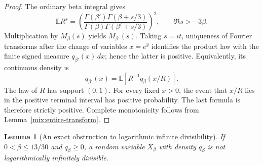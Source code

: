 \documentclass[11pt,a4paper]{article}
\numberwithin{equation}{section}
\newtheorem{lemma}[theorem]{Lemma}
\theoremstyle{definition}\newtheorem{definition}[theorem]{Definition}
\theoremstyle{remark}\newtheorem{remark}[theorem]{Remark}
\begin{document}
\begin{proof}
The ordinary beta integral gives
\[
 \mathbb E R^s=
    \left(\frac{\Gamma(\beta')\Gamma(\beta+s/3)}
                {\Gamma(\beta)\Gamma(\beta'+s/3)}\right)^2,
                \qquad \Re s>-3\beta.
\]
Multiplication by \(M_\beta(s)\) yields \(M_{\beta'}(s)\).
Taking \(s=it\), uniqueness of Fourier transforms after the change
of variables \(x=e^y\) identifies the product law with the finite
signed measure \(q_{\beta'}(x)\,dx\); hence the latter is positive.
Equivalently, its continuous density is
\[
                q_{\beta'}(x)
                    =\mathbb E[R^{-1}q_\beta(x/R)].
\]
The law of \(R\) has support \((0,1)\).  For every fixed \(x>0\),
the event that \(x/R\) lies in the positive terminal interval has
positive probability.  The last formula is therefore strictly
positive.  Complete monotonicity follows from
Lemma~\ref{mix:entire-transform}.
\end{proof}

\begin{lemma}[An exact obstruction to logarithmic infinite divisibility]
\label{mix:not-id}
If \(0<\beta\le13/30\) and \(q_\beta\ge0\), a random variable
\(X_\beta\) with density \(q_\beta\) is not logarithmically
infinitely divisible.
\end{lemma}
\end{document}
